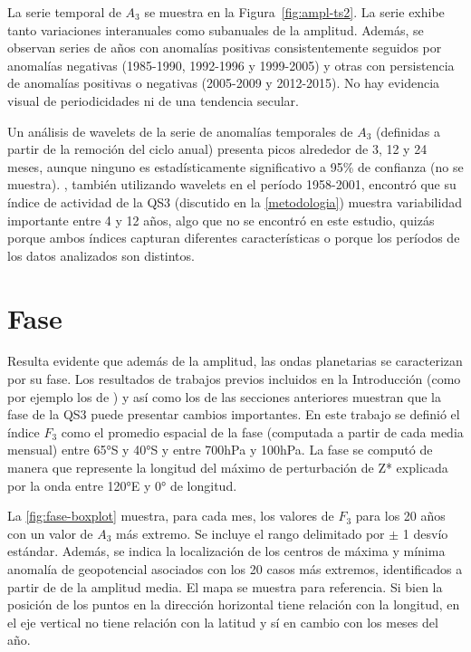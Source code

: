 \documentclass[spanish,a4paper,12pt,oneside]{book}
\begin{document}
La serie temporal de \(A_3\) se muestra en la Figura~\ref{fig:ampl-ts2}.
La serie exhibe tanto variaciones interanuales como subanuales de la
amplitud. Además, se observan series de años con anomalías positivas
consistentemente seguidos por anomalías negativas (1985-1990, 1992-1996
y 1999-2005) y otras con persistencia de anomalías positivas o negativas
(2005-2009 y 2012-2015). No hay evidencia visual de periodicidades ni de
una tendencia secular.

Un análisis de wavelets de la serie de anomalías temporales de \(A_3\)
(definidas a partir de la remoción del ciclo anual) presenta picos
alrededor de 3, 12 y 24 meses, aunque ninguno es estadísticamente
significativo a 95\% de confianza (no se muestra). \citet{Raphael2004},
también utilizando wavelets en el período 1958-2001, encontró que su
índice de actividad de la QS3 (discutido en la \autoref{metodologia})
muestra variabilidad importante entre 4 y 12 años, algo que no se
encontró en este estudio, quizás porque ambos índices capturan
diferentes características o porque los períodos de los datos analizados
son distintos.

\section{Fase}\label{fase}

Resulta evidente que además de la amplitud, las ondas planetarias se
caracterizan por su fase. Los resultados de trabajos previos incluidos
en la Introducción (como por ejemplo los de \citet{Trenberth1985}) y así
como los de las secciones anteriores muestran que la fase de la QS3
puede presentar cambios importantes. En este trabajo se definió el
índice \(F_3\) como el promedio espacial de la fase (computada a partir
de cada media mensual) entre 65°S y 40°S y entre 700hPa y 100hPa. La
fase se computó de manera que represente la longitud del máximo de
perturbación de Z* explicada por la onda entre 120°E y 0° de longitud.

La \autoref{fig:fase-boxplot} muestra, para cada mes, los valores de
\(F_3\) para los 20 años con un valor de \(A_3\) más extremo. Se incluye
el rango delimitado por \(\pm\) 1 desvío estándar. Además, se indica la
localización de los centros de máxima y mínima anomalía de geopotencial
asociados con los 20 casos más extremos, identificados a partir de de la
amplitud media. El mapa se muestra para referencia. Si bien la posición
de los puntos en la dirección horizontal tiene relación con la longitud,
en el eje vertical no tiene relación con la latitud y sí en cambio con
los meses del año.
\end{document}
